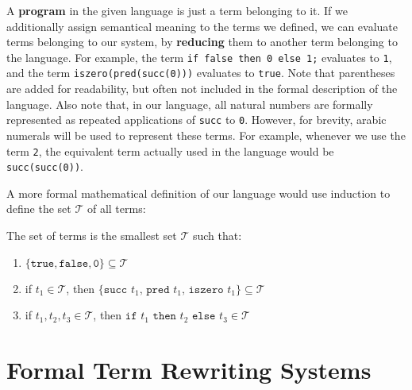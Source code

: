 \documentclass{report}
\newcommand*{\newpar}{\par\vspace{\baselineskip}\noindent}
\newcommand{\ttt}[1]{\texttt{#1}}
\newcommand{\tbf}[1]{\textbf{#1}}
\begin{document}
A \tbf{program} in the given language is just a term belonging to it. If we additionally assign semantical meaning to the terms we defined, we can evaluate terms belonging to our system, by \tbf{reducing} them to another term belonging to the language. For example, the term \ttt{if false then 0 else 1;} evaluates to \ttt{1}, and the term \ttt{iszero(pred(succ(0)))} evaluates to \ttt{true}. Note that parentheses are added for readability, but often not included in the formal description of the language. Also note that, in our language, all natural numbers are formally represented as repeated applications of \ttt{succ} to \ttt{0}. However, for brevity, arabic numerals will be used to represent these terms. For example, whenever we use the term \ttt{2}, the equivalent term actually used in the language would be \ttt{succ(succ(0))}.
\newpar
A more formal mathematical definition of our language would use induction to define the set $\mathcal{T}$ of all terms:
\begin{definition}
The set of terms is the smallest set $\mathcal{T}$ such that:
\begin{enumerate}
 \item $\{\ttt{true}, \ttt{false}, \ttt{0}\} \subseteq \mathcal{T}$
 \item if $t_1 \in \mathcal{T}$, then $\{\ttt{succ $t_1$, pred $t_1$, iszero $t_1$}\}\subseteq \mathcal{T}$
 \item if $t_1, t_2, t_3 \in \mathcal{T}$, then $\ttt{if $t_1$ then $t_2$ else $t_3$} \in \mathcal{T}$
\end{enumerate}

\end{definition}
%
\chapter{Formal Term Rewriting Systems}
\end{document}
